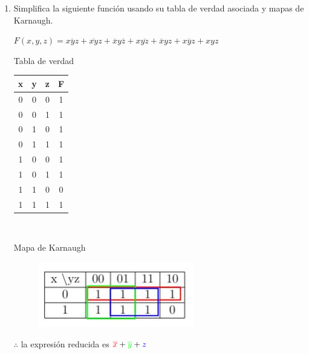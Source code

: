 \documentclass[a4paper,12pt]{article}
\begin{document}
\begin{enumerate}[label=\textcolor{teal}{\textbf{\arabic*.}}]
    \item Simplifica la siguiente función usando su tabla de verdad asociada y mapas de Karnaugh.
    
        \begin{center}
            $F(x,y,z) = \overline{xyz} + \overline{xy} z + \overline{x} y \overline{z} + x \overline{yz} +  \overline{x} yz +x \overline{y} z +xyz $
        \end{center}

        Tabla de verdad

        \begin{center}
            \begin{table}[h]
            \centering
            \begin{tabular}{|c|c|c|c|}
                \hline
                x & y & z & F \\ 
                \hline
                0 & 0 & 0 & 1 \\ 
                \hline 
                0 & 0 & 1 & 1 \\ 
                \hline 
                0 & 1 & 0 & 1 \\ 
                \hline 
                0 & 1 & 1 & 1 \\ 
                \hline 
                1 & 0 & 0 & 1 \\ 
                \hline 
                1 & 0 & 1 & 1 \\ 
                \hline 
                1 & 1 & 0 & 0 \\
                \hline 
                1 & 1 & 1 & 1 \\ 
                \hline 
            \end{tabular}\\
        \end{table}
        \end{center}

        Mapa de Karnaugh

        \begin{figure}[h]
            \centering
            \includegraphics[width=5 cm]{img/mapa7.jpg}
        \end{figure}
        
        $ \therefore$ la expresión reducida es  $ \textcolor{red}{\overline{x}}+ \textcolor{green}{\overline{y}} + \textcolor{blue}{z}$


\end{enumerate}
\end{document}
